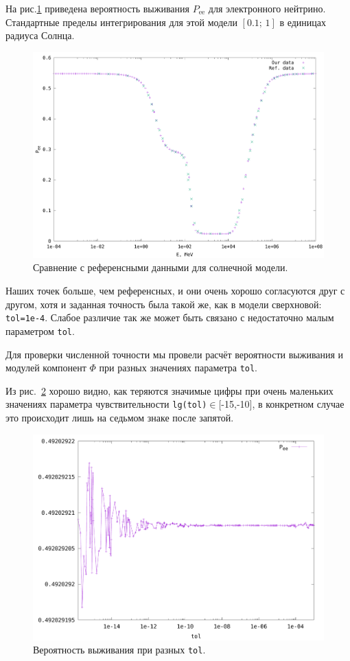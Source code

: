 \documentclass[12pt]{article}
\begin{document}
На рис.\ref{fig:6} приведена вероятность выживания \(P_{\text{ee}}\) для электронного нейтрино. Стандартные пределы интегрирования для этой модели $[0.1;\,1]$ в единицах радиуса Солнца.
\begin{figure}[H]
  \hspace*{-2em}
  \includegraphics[scale=0.6]{sun_our_vs_ref}
  \caption{\label{fig:6}Сравнение с референсными данными для солнечной модели.}
\end{figure}

Наших точек больше, чем референсных, и они очень хорошо согласуются друг с другом, хотя и заданная точность была такой же, как в модели сверхновой: \verb|tol=1e-4|. Слабое различие так же может быть связано с недостаточно малым параметром \verb|tol|.

Для проверки численной точности мы провели расчёт вероятности выживания и
модулей компонент \(\Phi\) при разных значениях параметра \verb|tol|.

Из рис.~\ref{fig:7} хорошо видно, как теряются значимые цифры при очень маленьких значениях параметра чувствительности \verb|lg(tol)|$\in$[-15,-10], в конкретном случае это происходит лишь на седьмом знаке после запятой.

\begin{figure}[H]
  \hspace{0.5cm}
  \includegraphics[scale=0.51]{sun_Pee}
  \caption{\label{fig:7}Вероятность выживания при разных \texttt{tol}.}
\end{figure}
\end{document}
